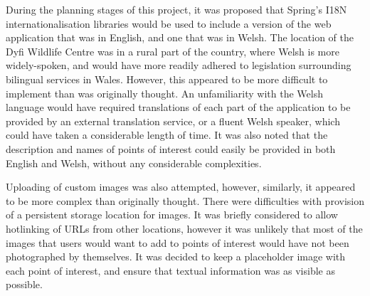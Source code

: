 During the planning stages of this project, it was proposed that Spring's I18N internationalisation libraries would be used to include a version of the web application that was in English, and one that was in Welsh. The location of the Dyfi Wildlife Centre was in a rural part of the country, where Welsh is more widely-spoken, and would have more readily adhered to legislation surrounding bilingual services in Wales. However, this appeared to be more difficult to implement than was originally thought. An unfamiliarity with the Welsh language would have required translations of each part of the application to be provided by an external translation service, or a fluent Welsh speaker, which could have taken a considerable length of time. It was also noted that the description and names of points of interest could easily be provided in both English and Welsh, without any considerable complexities.

Uploading of custom images was also attempted, however, similarly, it appeared to be more complex than originally thought. There were difficulties with provision of a persistent storage location for images. It was briefly considered to allow hotlinking of URLs from other locations, however it was unlikely that most of the images that users would want to add to points of interest would have not been photographed by themselves. It was decided to keep a placeholder image with each point of interest, and ensure that textual information was as visible as possible.

